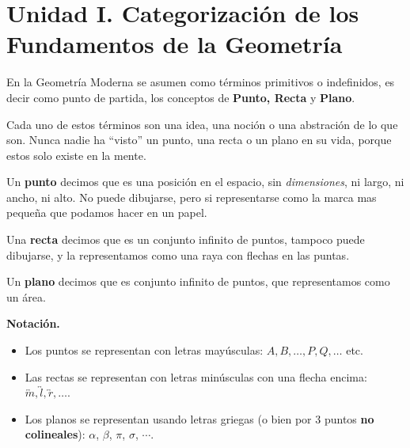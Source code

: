 \section{\large Unidad I. Categorización de los Fundamentos de la Geometría}

En la Geometría Moderna se asumen como términos primitivos o indefinidos, es decir como punto de partida, los conceptos de \textbf{Punto, Recta} y \textbf{Plano}.

Cada uno de estos términos son una idea, una noción o una abstración de lo que son.
Nunca nadie ha ``visto'' un punto, una recta o un plano en su vida, porque estos solo existe en la mente.

Un \textbf{punto} decimos que es una posición en el espacio, sin \textit{dimensiones}, ni largo, ni ancho, ni alto.
No puede dibujarse, pero si representarse como la marca mas pequeña que podamos hacer en un papel.

Una \textbf{recta} decimos que es un conjunto infinito de puntos, tampoco puede dibujarse, y la representamos como una raya con flechas en las puntas.

Un \textbf{plano} decimos que es conjunto infinito de puntos, que representamos como un área.

\textbf{Notación.}
\begin{itemize}
    \item Los puntos se representan con letras mayúsculas: $A, B, \ldots, P, Q, \ldots$ etc.
    \item Las rectas se representan con letras minúsculas con una flecha encima: $\overleftrightarrow{m}, \overleftrightarrow{l}, \overleftrightarrow{r}, \ldots$.
    \item Los planos se representan usando letras griegas (o bien por 3 puntos \textbf{no colineales}): $\alpha$, $\beta$, $\pi$, $\sigma$, $\cdots$.
\end{itemize}

